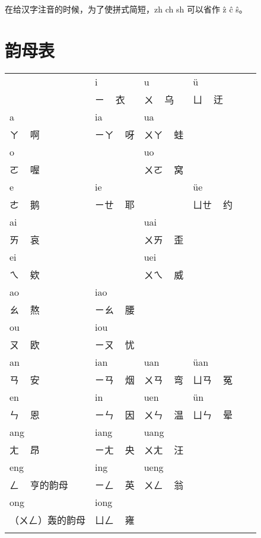 \documentclass[zihao=-4,fontset=none]{ctexart}
\begin{document}
在给汉字注音的时候，为了使拼式简短，zh ch sh 可以省作 ẑ ĉ ŝ。

\section{韵母表}

\begin{center}
  \begin{longtable}{Vp{4cm}|p{2.5cm}|p{2.5cm}|p{2.5cm}V}
        & i    & u    & ü   \\                  & ㄧ   ~ 衣 & ㄨ   ~ 乌 & ㄩ   ~ 迂 \\ \hline
    a   & ia   & ua   &     \\ ㄚ ~ 啊          & ㄧㄚ ~ 呀 & ㄨㄚ ~ 蛙 &           \\ \hline
    o   &      & uo   &     \\ ㄛ ~ 喔          &           & ㄨㄛ ~ 窝 &           \\ \hline
    e   & ie   &      & üe  \\ ㄜ ~ 鹅          & ㄧㄝ ~ 耶 &           & ㄩㄝ ~ 约 \\ \hline
    ai  &      & uai  &     \\ ㄞ ~ 哀          &           & ㄨㄞ ~ 歪 &           \\ \hline
    ei  &      & uei  &     \\ ㄟ ~ 欸          &           & ㄨㄟ ~ 威 &           \\ \hline
    ao  & iao  &      &     \\ ㄠ ~ 熬          & ㄧㄠ ~ 腰 &           &           \\ \hline
    ou  & iou  &      &     \\ ㄡ ~ 欧          & ㄧㄡ ~ 忧 &           &           \\ \hline
    an  & ian  & uan  & üan \\ ㄢ ~ 安          & ㄧㄢ ~ 烟 & ㄨㄢ ~ 弯 & ㄩㄢ ~ 冤 \\ \hline
    en  & in   & uen  & ün  \\ ㄣ ~ 恩          & ㄧㄣ ~ 因 & ㄨㄣ ~ 温 & ㄩㄣ ~ 晕 \\ \hline
    ang & iang & uang &     \\ ㄤ ~ 昂          & ㄧㄤ ~ 央 & ㄨㄤ ~ 汪 &           \\ \hline
    eng & ing  & ueng &     \\ ㄥ ~ 亨的韵母    & ㄧㄥ ~ 英 & ㄨㄥ ~ 翁 &           \\ \hline
    ong & iong &      &     \\ （ㄨㄥ）轰的韵母 & ㄩㄥ ~ 雍 &           &           \\
  \end{longtable}
\end{center}
\end{document}
